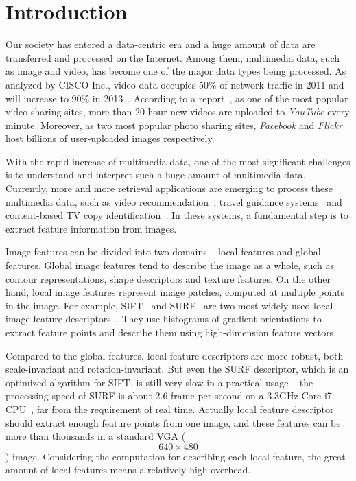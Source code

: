 \section{Introduction}

Our society has entered a data-centric era and a huge amount of data are transferred and processed on the Internet. Among them, multimedia data, such as image and video, has become one of the major data types being processed. As analyzed by CISCO Inc., video data occupies 50\% of network traffic in 2011 and will increase to 90\% in 2013~\cite{CISCO2011}.  According to a report~\cite{youtube2009}, as one of the most popular video sharing sites, more than 20-hour new videos are uploaded to \emph{YouTube} every minute. Moreover, as two most popular photo sharing sites, \emph{Facebook} and \emph{Flickr} host billions of user-uploaded images respectively.

With the rapid increase of multimedia data, one of the most significant challenges is to understand and interpret such a huge amount of multimedia data. Currently, more and more retrieval applications are emerging to process these multimedia data, such as video recommendation~\cite{videorecommendation2007}, travel guidance systems~\cite{travelguidance2010} and content-based TV copy identification~\cite{tvidentify2003}. In these systems, a fundamental step is to extract feature information from images. 

Image features can be divided into two domains -- local features and global features. Global image features tend to describe the image as a whole, such as contour representations, shape descriptors and texture features. On the other hand, local image features represent image patches, computed at multiple points in the image. For example, SIFT~\cite{Lowe2004SIFT} and SURF~\cite{Bay2006SURF} are two most widely-used local image feature descriptors~\cite{Mikolajczyk2005Evaluation}\cite{Bauer2007Evaluation}. They use histograms of gradient orientations to extract feature points and describe them using high-dimension feature vectors.

Compared to the global features, local feature descriptors are more robust, both scale-invariant and rotation-invariant. But even the SURF descriptor, which is an optimized algorithm for SIFT, is still very slow in a practical usage -- the processing speed of SURF is about 2.6 frame per second on a 3.3GHz Core i7 CPU~\cite{}, far from the requirement of real time. Actually local feature descriptor should extract enough feature points from one image, and these features can be more than thousands in a standard VGA ($$640\times480$$) image. Considering the computation for describing each local feature, the great amount of local features means a relatively high overhead.

